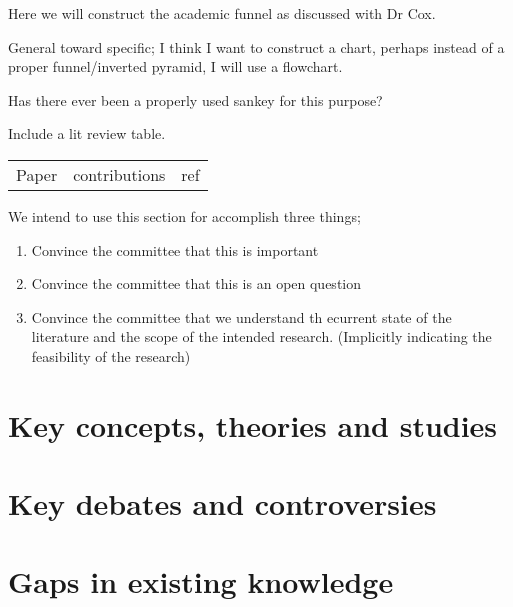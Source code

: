 
Here we will construct the academic funnel as discussed with Dr Cox.

General toward specific;
I think I want to construct a chart, perhaps instead of a proper
funnel/inverted pyramid, I will use a flowchart.

Has there ever been a properly used sankey for this purpose?


Include a lit review table.

\begin{tabular}{ccc}
    Paper & contributions & ref 
\end{tabular}

We intend to use this section for accomplish three things;
\begin{enumerate}
    \item Convince the committee that this is important
    \item Convince the committee that this is an open question
    \item Convince the committee that we understand th ecurrent state of the literature and the scope of the intended research. (Implicitly indicating the feasibility of the research)
\end{enumerate}

\section{Key concepts, theories and studies}
\section{Key debates and controversies}
\section{Gaps in existing knowledge}

